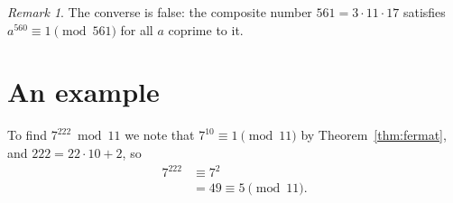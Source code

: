 \documentclass[10pt,letterpaper]{article}
\theoremstyle{remark}
\newtheorem*{remark}{Remark}
\begin{document}
\begin{remark}
The converse is false: the composite number $561=3\cdot11\cdot17$ satisfies $a^{560}\equiv1\pmod{561}$ for all $a$ coprime to it.
\end{remark}

\section{An example}
To find $7^{222}\bmod 11$ we note that $7^{10}\equiv1\pmod{11}$ by Theorem~\ref{thm:fermat}, and $222=22\cdot10+2$, so
\begin{align*}
  7^{222} &\equiv 7^2 \\
          &= 49 \equiv 5 \pmod{11}.
\end{align*}
\end{document}
